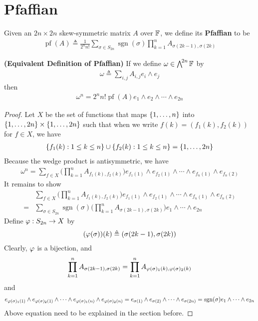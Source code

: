 \documentclass{report}
\begin{document}
\section{Pfaffian}
Given an $2n\times 2n$ skew-symmetric matrix $A$ over $\mathbb{F}$, we define  its \textbf{Pfaffian} to be 
\begin{align*}
\operatorname{pf}(A)\triangleq \frac{1}{2^nn!}\sum_{\sigma \in S_{2n}} \operatorname{sgn}(\sigma) \prod_{k=1}^n A_{\sigma (2k-1), \sigma (2k)} 
\end{align*}
\begin{theorem}
\label{EDoP}
\textbf{(Equivalent Definition of Pfaffian)} If we define $\omega \in \extp^{2n} \F$ by 
\begin{align*}
\omega \triangleq  \sum_{i,j}A_{i,j}e_i \wedge  e_j 
\end{align*}
then 
\begin{align*}
\omega^n = 2^n n! \operatorname{pf}(A)e_1 \wedge  e_2 \wedge  \cdots \wedge  e_{2n}   
\end{align*}
\end{theorem}
\begin{proof}
Let $X$ be the set of functions that maps  $\left\{ 1,\dots ,n \right\}$ into $\left\{ 1,\dots ,2n \right\}\times \left\{ 1,\dots ,2n \right\}$ such that when we write $f(k)=(f_1(k),f_2(k))$ for $f \in X$, we have 
\begin{align*}
  \left\{ f_1(k):1\leq k\leq n  \right\} \cup  \left\{ f_2(k): 1 \leq k \leq n \right\}= \left\{ 1,\dots ,2n \right\}
\end{align*}
Because the wedge product is antisymmetric, we have 
\begin{align*}
\omega^n = \sum_{f \in X} \Big(\prod_{k=1}^n A_{f_1(k),f_2(k)} \Big) e_{f_1(1)}\wedge  e_{f_2(1)}\wedge  \cdots \wedge  e_{f_n(1)} \wedge  e_{f_n(2)}    
\end{align*}
It remains to show 
\begin{align*}
 &\sum_{f \in X} \Big(\prod_{k=1}^n A_{f_1(k),f_2(k)} \Big) e_{f_1(1)}\wedge  e_{f_2(1)}\wedge  \cdots \wedge  e_{f_n(1)} \wedge  e_{f_n(2)}  \\
 =& \sum_{\sigma \in S_{2n}} \operatorname{sgn}(\sigma) \Big(\prod_{k=1}^n A_{\sigma (2k-1), \sigma (2k)} \Big)  e_1 \wedge \cdots \wedge   e_{2n} 
\end{align*}
Define $\pfi: S_{2n}\rightarrow X$ by 
\begin{align*}
  (\pfi (\sigma))(k)\triangleq (\sigma (2k-1),\sigma (2k))
\end{align*}
Clearly, $\pfi$ is a bijection, and 
\begin{align*}
\prod_{k=1}^n A_{\sigma (2k-1), \sigma (2k)} = \prod_{k=1}^n A_{\pfi(\sigma)_1(k),\pfi(\sigma)_2(k)} 
\end{align*}
and 
\begin{align*}
e_{\pfi (\sigma)_1 (1)}\wedge  e_{\pfi (\sigma)_2(1)}\wedge  \cdots \wedge  e_{\pfi(\sigma)_1(n)}   \wedge  e_{\pfi (\sigma)_2(n)}= e_{\sigma(1)}\wedge  e_{\sigma (2)}\wedge  \cdots \wedge  e_{\sigma (2n)}   = \operatorname{sgn}(\sigma)e_1 \wedge  \cdots \wedge  e_{2n}  
\end{align*}
Above equation need to be explained in the section before.
\end{proof}
\end{document}

